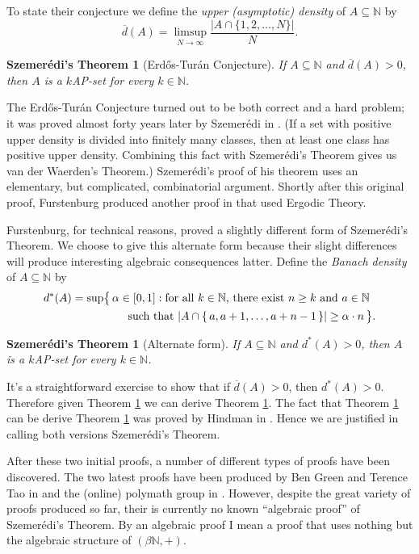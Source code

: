 \documentclass[12pt]{article}
\theoremstyle{plain}
\newtheorem{sz}[thm]{Szemer\'{e}di's Theorem}
\theoremstyle{definition}
\newcommand{\bbN}{\mathbb{N}}
\begin{document}
To state their conjecture we define the \textsl{upper (asymptotic)
  density} of $A \subseteq \bbN$ by 
  \[
    \overline{d}(A) = \limsup_{N\to\infty} \frac{|A \cap \{1, 2,
      \ldots, N\}|}{N}.
  \]
  \begin{sz}[Erd\H{o}s-Tur\'{a}n Conjecture]
    \label{sz:upperdensity}
    If $A \subseteq \bbN$ and $\overline{d}(A) > 0$, then $A$ is a
    $k$AP-set for every $k \in \bbN$.
  \end{sz}

The Erd\H{o}s-Tur\'{a}n Conjecture turned out to be both correct and a
hard problem; it was proved almost forty years later by Szemer\'{e}di in
\cite{Szemeredi:1975uq}. 
(If a set with positive upper density is divided into finitely many
classes, then at least one class has positive upper density.
Combining this fact with Szemer\'{e}di's Theorem gives us van der
Waerden's Theorem.)
Szemer\'{e}di's proof of his theorem uses an elementary, but
complicated, combinatorial argument. 
Shortly after this original proof, Furstenburg produced another proof
in \cite{Furstenberg:1977fk} that used Ergodic Theory. 

Furstenburg, for technical reasons, proved a slightly different form
of Szemer\'{e}di's Theorem. 
We choose to give this alternate form because their slight differences
will produce interesting algebraic consequences latter.
Define the \textsl{Banach density} of $A \subseteq \bbN$ by
  \begin{align*}
    d^*(A) &= \sup\bigl\{\, \alpha \in [0,1] : \hbox{for all $k \in
      \bbN$, there exist $n \ge k$ and $a \in \bbN$} \\
    &\hspace{5em}\hbox{such that $|A \cap \{\,a, a+1, \ldots,
      a+n-1\,\}| \ge \alpha\cdot n$} \,\bigr\}.
  \end{align*}
  \begin{sz}[Alternate form]
    \label{sz:banach}
    If $A \subseteq \bbN$ and $d^*(A) > 0$, then $A$ is a $k$AP-set
    for every $k \in \bbN$.
  \end{sz}
It's a straightforward exercise to show that if $\overline{d}(A) > 0$,
then $d^*(A) > 0$.
Therefore given Theorem \ref{sz:banach} we can derive Theorem
\ref{sz:upperdensity}.
The fact that Theorem \ref{sz:upperdensity} can be derive Theorem
\ref{sz:banach} was proved by Hindman in \cite[Theorem
2.1]{Hindman:1982fk}.
Hence we are justified in calling both versions Szemer\'{e}di's
Theorem. 

After these two initial proofs, a number of different types of proofs
have been discovered. 
The two latest proofs have been produced by Ben Green and Terence Tao
in \cite{Green:2010uq} and the (online) polymath group in
\cite{Polymath:2010kx}. 
However, despite the great variety of proofs produced so far, their is
currently no known ``algebraic proof'' of Szemer\'{e}di's Theorem.
By an algebraic proof I mean a proof that uses nothing but the
algebraic structure of $(\beta\bbN, +)$. 
\end{document}

